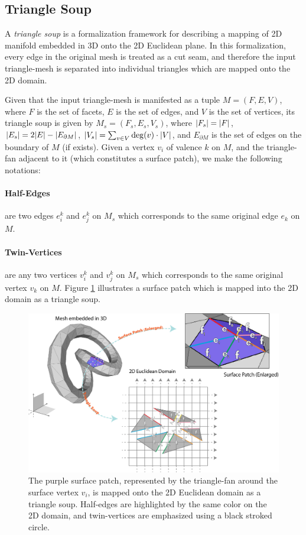 \subsection{Triangle Soup}
\label{sec:triangle_soup}
A \emph{triangle soup} is a formalization framework for describing a mapping of 2D manifold embedded in 3D onto the 2D Euclidean plane. In this formalization, every edge in the original mesh is treated as a cut seam, and therefore the input triangle-mesh is separated into individual triangles which are mapped onto the 2D domain.

\noindent Given that the input triangle-mesh is manifested as a tuple $M = (F,E,V)$, where $F$ is the set of facets, $E$ is the set of edges, and $V$ is the set of vertices, its triangle soup is given by $M_s = (F_s,E_s,V_s)$, where $\lvert F_s\rvert = \lvert F\rvert$, $\lvert E_s\rvert = 2\lvert E\rvert - \lvert E_{\partial M}\rvert$, $\lvert V_s\rvert = \sum_{v \in V} \mathrm{deg}(v) \cdot\lvert V\rvert$, and $E_{\partial M}$ is the set of edges on the boundary of $M$ (if exists). Given a vertex $v_i$ of valence $k$ on $M$, and the triangle-fan adjacent to it (which constitutes a surface patch), we make the following notations:
\paragraph{Half-Edges} are two edges $e_i^k$ and $e_j^k$ on $M_s$ which corresponds to the same original edge $e_k$ on $M$.
\paragraph{Twin-Vertices} are any two vertices $v_i^k$ and $v_j^k$ on $M_s$ which corresponds to the same original vertex $v_k$ on $M$.
\noindent Figure \ref{fig:triangle_soup} illustrates a surface patch which is mapped into the 2D domain as a triangle soup.
\begin{figure}[ht]
\centering
\includegraphics[width=16cm]{figures/triangle_soup.png}
\caption[Triangle Soup]{The purple surface patch, represented by the triangle-fan around the surface vertex $v_i$, is mapped onto the 2D Euclidean domain as a triangle soup. Half-edges are highlighted by the same color on the 2D domain, and twin-vertices are emphasized using a black stroked circle.}
\label{fig:triangle_soup}
\end{figure}
